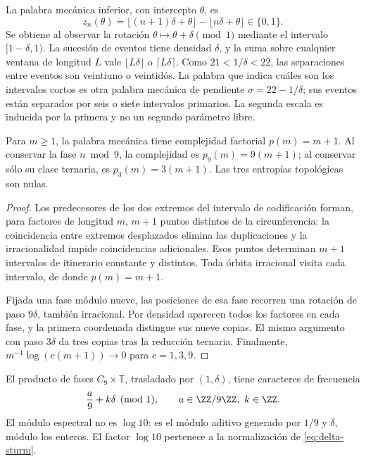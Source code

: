 La palabra mecánica inferior, con intercepto \(\theta\), es
\[
 z_n(\theta)=\lfloor(n+1)\delta+\theta\rfloor-\lfloor n\delta+\theta\rfloor\in\{0,1\}.
\]
Se obtiene al observar la rotación \(\theta\mapsto\theta+\delta\pmod1\) mediante el intervalo \([1-\delta,1)\). La sucesión de eventos tiene densidad \(\delta\), y la suma sobre cualquier ventana de longitud \(L\) vale \(\lfloor L\delta\rfloor\) o \(\lceil L\delta\rceil\). Como \(21<1/\delta<22\), las separaciones entre eventos son veintiuno o veintidós. La palabra que indica cuáles son los intervalos cortos es otra palabra mecánica de pendiente \(\sigma=22-1/\delta\); sus eventos están separados por seis o siete intervalos primarios. La segunda escala es inducida por la primera y no un segundo parámetro libre.



\begin{theorem}
Para \(m\ge1\), la palabra mecánica tiene complejidad factorial \(p(m)=m+1\). Al conservar la fase \(n\bmod9\), la complejidad es \(p_9(m)=9(m+1)\); al conservar sólo su clase ternaria, es \(p_3(m)=3(m+1)\). Las tres entropías topológicas son nulas.
\end{theorem}
\begin{proof}
Los predecesores de los dos extremos del intervalo de codificación forman, para factores de longitud \(m\), \(m+1\) puntos distintos de la circunferencia: la coincidencia entre extremos desplazados elimina las duplicaciones y la irracionalidad impide coincidencias adicionales. Esos puntos determinan \(m+1\) intervalos de itinerario constante y distintos. Toda órbita irracional visita cada intervalo, de donde \(p(m)=m+1\).

Fijada una fase módulo nueve, las posiciones de esa fase recorren una rotación de paso \(9\delta\), también irracional. Por densidad aparecen todos los factores en cada fase, y la primera coordenada distingue sus nueve copias. El mismo argumento con paso \(3\delta\) da tres copias tras la reducción ternaria. Finalmente, \(m^{-1}\log(c(m+1))\to0\) para \(c=1,3,9\).
\end{proof}

El producto de fases \(C_9\times\mathbb T\), trasladado por \((1,\delta)\), tiene caracteres de frecuencia
\[
 \frac a9+k\delta\pmod1,\qquad a\in\ZZ/9\ZZ,\ k\in\ZZ.
\]
El módulo espectral no es \(\log10\): es el módulo aditivo generado por \(1/9\) y \(\delta\), módulo los enteros. El factor \(\log10\) pertenece a la normalización de \eqref{eq:delta-sturm}.


